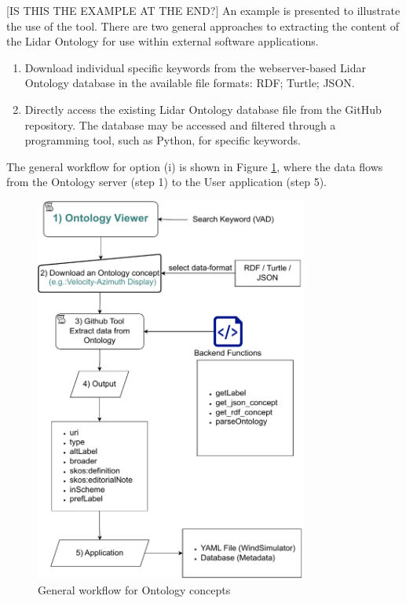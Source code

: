 \documentclass[remotesensing,article,submit,pdftex,moreauthors]{Definitions/mdpi}
\begin{document}
[IS THIS THE EXAMPLE AT THE END?] An example is presented to illustrate the use of the tool.
There are two general approaches to extracting the content of the Lidar Ontology for use within external software applications. 
\begin{enumerate}[label=(\roman*)]

    \item Download individual specific keywords from the webserver-based Lidar Ontology database in the available file formats: RDF; Turtle; JSON.

    \item Directly access the existing Lidar Ontology database file from the GitHub repository. The database may be accessed and filtered through a programming tool, such as Python, for specific keywords.

\end{enumerate}
The general workflow for option (i) is shown in Figure \ref{Ontology_workflow}, where the data flows from the Ontology server (step 1) to the User application (step 5).
\begin{figure}[h!]
    \centering
    \includegraphics[width=0.8\textwidth]{Figures/Ontology_flow.drawio.pdf}
    \caption{General workflow for Ontology concepts}
    \label{Ontology_workflow}
\end{figure}
\end{document}
